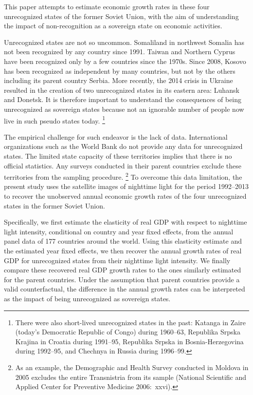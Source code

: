 \documentclass[12pt,a4paper]{article}%
\begin{document}
This paper attempts to estimate economic growth rates in these four unrecognized states of the former Soviet Union, with the aim of understanding the impact of non-recognition as a sovereign state on economic activities. 

Unrecognized states are not so uncommon. 
Somaliland in northwest Somalia has not been recognized by any country since 1991. 
Taiwan and Northern Cyprus have been recognized only by a few countries since the 1970s. 
Since 2008, Kosovo has been recognized as independent by many countries, but not by the others including its parent country Serbia.
More recently, the 2014 crisis in Ukraine resulted in the creation of two unrecognized states in its eastern area: Luhansk and Donetsk.
It is therefore important to understand the consequences of being unrecognized as sovereign states because not an ignorable number of people now live in such pseudo states today.%
\footnote{
	There were also short-lived unrecognized states in the past: Katanga in Zaire (today's Democratic Republic of Congo) during 1960--63, Republika Srpska Krajina in Croatia during 1991--95, Republika Srpska in Bosnia-Herzegovina during 1992--95, and Chechnya in Russia during 1996--99.
	}

The empirical challenge for such endeavor is the lack of data. International organizations such as the World Bank do not provide any data for unrecognized states. 
The limited state capacity of these territories implies that there is no official statistics. 
Any surveys conducted in their parent countries exclude these territories from the sampling procedure.%
\footnote{%
	As an example, the Demographic and Health Survey conducted in Moldova in 2005 excludes the entire Transnistria from its sample (National Scientific and Applied Center for Preventive Medicine 2006:\ xxvi).
} 
To overcome this data limitation, the present study uses the satellite images of nighttime light for the period 1992--2013 to recover the unobserved annual economic growth rates of the four unrecognized states in the former Soviet Union.

Specifically, we first estimate the elasticity of real GDP with respect to nighttime light intensity, conditional on country and year fixed effects, from the annual panel data of 177 countries around the world. 
Using this elasticity estimate and the estimated year fixed effects, we then recover the annual growth rates of real GDP for unrecognized states from their nighttime light intensity. 
We finally compare these recovered real GDP growth rates to the ones similarly estimated for the parent countries. 
Under the assumption that parent countries provide a valid counterfactual, the difference in the annual growth rates can be interpreted as the impact of being unrecognized as sovereign states. 
\end{document}
